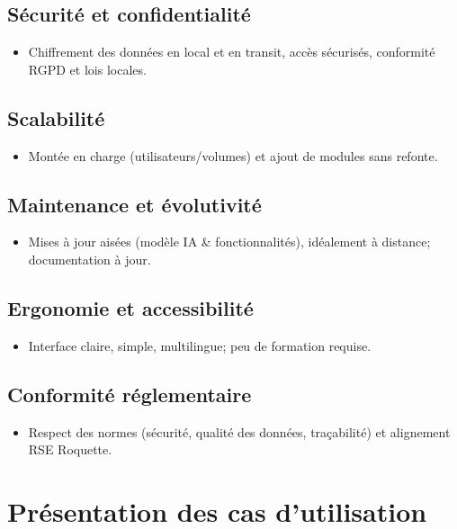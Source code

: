 \documentclass[12pt,a4paper]{report}
\begin{document}
\subsection*{Sécurité et confidentialité}
\begin{itemize}
    \item Chiffrement des données en local et en transit, accès sécurisés, conformité RGPD et lois locales.
\end{itemize}

\subsection*{Scalabilité}
\begin{itemize}
    \item Montée en charge (utilisateurs/volumes) et ajout de modules sans refonte.
\end{itemize}

\subsection*{Maintenance et évolutivité}
\begin{itemize}
    \item Mises à jour aisées (modèle IA \& fonctionnalités), idéalement à distance; documentation à jour.
\end{itemize}

\subsection*{Ergonomie et accessibilité}
\begin{itemize}
    \item Interface claire, simple, multilingue; peu de formation requise.
\end{itemize}

\subsection*{Conformité réglementaire}
\begin{itemize}
    \item Respect des normes (sécurité, qualité des données, traçabilité) et alignement RSE Roquette.
\end{itemize}


\section{Présentation des cas d’utilisation}
\end{document}
